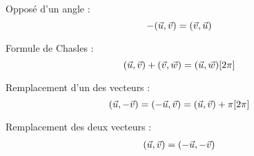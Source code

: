 \begin{multicols}{2}

Opposé d'un angle :
\begin{equation}
-(\vec{u}, \vec{v}) = (\vec{v}, \vec{u})
\label{eq:oppose}
\end{equation}

Formule de Chasles :
\begin{equation}
(\vec{u}, \vec{v}) + (\vec{v}, \vec{w}) = (\vec{u}, \vec{w}) [2\pi]
\label{eq:chasles}
\end{equation}

Remplacement d'un des vecteurs :
\begin{equation}
(\vec{u}, -\vec{v}) = (-\vec{u}, \vec{v}) = (\vec{u}, \vec{v}) + \pi [2\pi]
\end{equation}

Remplacement des deux vecteurs :
\begin{eqnarray}
(\vec{u}, \vec{v}) = (-\vec{u}, -\vec{v})
\label{eq:opposes2}
\end{eqnarray}

\end{multicols}